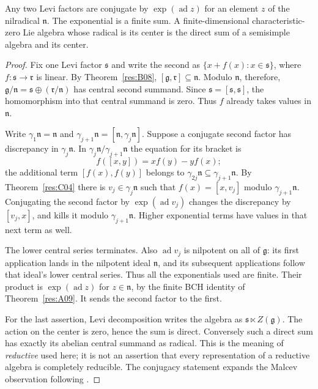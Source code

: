 \begin{theorem}\label{res:I07}
Any two Levi factors are conjugate by
\(\exp(\operatorname{ad}z)\) for an element \(z\) of the nilradical
\(\mathfrak n\). The exponential is a finite sum.
A finite-dimensional characteristic-zero Lie algebra whose radical
is its center is the direct sum of a semisimple algebra and its center.
\end{theorem}
\begin{proof}
Fix one Levi factor \(\mathfrak s\) and write the second as
\(\{x+f(x):x\in\mathfrak s\}\), where \(f:\mathfrak s\to\mathfrak r\)
is linear. By Theorem~\ref{res:B08},
\([\mathfrak g,\mathfrak r]\subseteq\mathfrak n\).
Modulo \(\mathfrak n\), therefore,
\(\mathfrak g/\mathfrak n=\mathfrak s\oplus(\mathfrak r/\mathfrak n)\)
has central second summand. Since \(\mathfrak s=[\mathfrak s,\mathfrak s]\),
the homomorphism into that central summand is zero. Thus \(f\)
already takes values in \(\mathfrak n\).

Write \(\gamma_1\mathfrak n=\mathfrak n\) and
\(\gamma_{j+1}\mathfrak n=[\mathfrak n,\gamma_j\mathfrak n]\).
Suppose a conjugate second factor has discrepancy in
\(\gamma_j\mathfrak n\). In
\(\gamma_j\mathfrak n/\gamma_{j+1}\mathfrak n\) the equation for its
bracket is
\[
 f([x,y])=x f(y)-y f(x);
\]
the additional term \([f(x),f(y)]\) belongs to
\(\gamma_{2j}\mathfrak n\subseteq\gamma_{j+1}\mathfrak n\).
By Theorem~\ref{res:C04} there is \(v_j\in\gamma_j\mathfrak n\)
such that \(f(x)=[x,v_j]\) modulo \(\gamma_{j+1}\mathfrak n\).
Conjugating the second factor by \(\exp(\operatorname{ad}v_j)\)
changes the discrepancy by \([v_j,x]\), and kills it modulo
\(\gamma_{j+1}\mathfrak n\). Higher exponential terms have values
in that next term as well.

The lower central series terminates. Also
\(\operatorname{ad}v_j\) is nilpotent on all of \(\mathfrak g\):
its first application lands in the nilpotent ideal \(\mathfrak n\),
and its subsequent applications follow that ideal's lower central
series. Thus all the exponentials used are finite. Their product
is \(\exp(\operatorname{ad}z)\) for \(z\in\mathfrak n\), by the
finite BCH identity of Theorem~\ref{res:A09}. It sends the
second factor to the first.

For the last assertion, Levi decomposition writes the algebra as
\(\mathfrak s\ltimes Z(\mathfrak g)\). The action on the center is
zero, hence the sum is direct. Conversely such a direct sum has
exactly its abelian central summand as radical. This is the
meaning of \emph{reductive} used here; it is not an assertion that
every representation of a reductive algebra is completely reducible.
The conjugacy statement expands the Malcev observation following
\cite[Theorem 7.8.13]{weibel}.
\end{proof}

